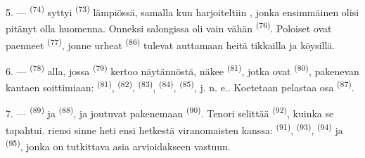 5. ---  \textsuperscript{(74)} syttyi 
\textsuperscript{(73)} lämpiössä, samalla kun harjoiteltiin ,
jonka ensimmäinen  olisi pitänyt olla huomenna. Onneksi
salongissa oli vain vähän  \textsuperscript{(76)}. Poloiset
ovat paenneet  \textsuperscript{(77)}, jonne urheat
 \textsuperscript{(86)} tulevat auttamaan heitä tikkailla ja
köysillä.

6. ---  \textsuperscript{(78)} alla, jossa
 \textsuperscript{(79)} kertoo näytännöstä, näkee
 \textsuperscript{(81)}, jotka ovat 
\textsuperscript{(80)}, pakenevan kantaen soittimiaan: 
\textsuperscript{(81)},  \textsuperscript{(82)},
 \textsuperscript{(83)}, 
\textsuperscript{(84)},  \textsuperscript{(85)}, j. n. e..
Koetetaan pelastaa osa  \textsuperscript{(87)}.

7. ---  \textsuperscript{(89)} ja
 \textsuperscript{(88)},  ja
 joutuvat pakenemaan 
\textsuperscript{(90)}. Tenori selittää 
\textsuperscript{(92)}, kuinka se tapahtui.  riensi sinne
heti ensi hetkestä viranomaisten kanssa: 
\textsuperscript{(91)},  \textsuperscript{(93)},
 \textsuperscript{(94)} ja  \textsuperscript{(95)}, jonka on tutkittava asia arvioidakseen
vastuun.
\VUsaut{6.0mm}
\VUfilet{22mm}
